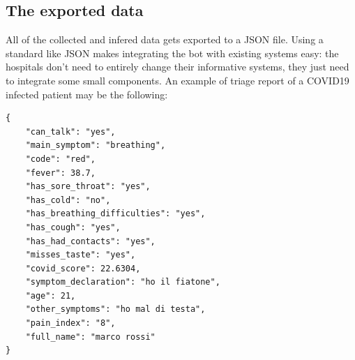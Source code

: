 \documentclass[conference]{IEEEtran}
\begin{document}
\subsection{The exported data}
All of the collected and infered data gets exported to a JSON file. Using a standard like JSON makes integrating the bot with existing systems easy: the hospitals don't need to entirely change their informative systems, they just need to integrate some small components. An example of triage report of a COVID19 infected patient may be the following:
\begin{verbatim}
{
    "can_talk": "yes",
    "main_symptom": "breathing",
    "code": "red",
    "fever": 38.7,
    "has_sore_throat": "yes",
    "has_cold": "no", 
    "has_breathing_difficulties": "yes", 
    "has_cough": "yes",
    "has_had_contacts": "yes",
    "misses_taste": "yes",
    "covid_score": 22.6304,
    "symptom_declaration": "ho il fiatone",
    "age": 21,
    "other_symptoms": "ho mal di testa", 
    "pain_index": "8",
    "full_name": "marco rossi"
}
\end{verbatim}
\end{document}
